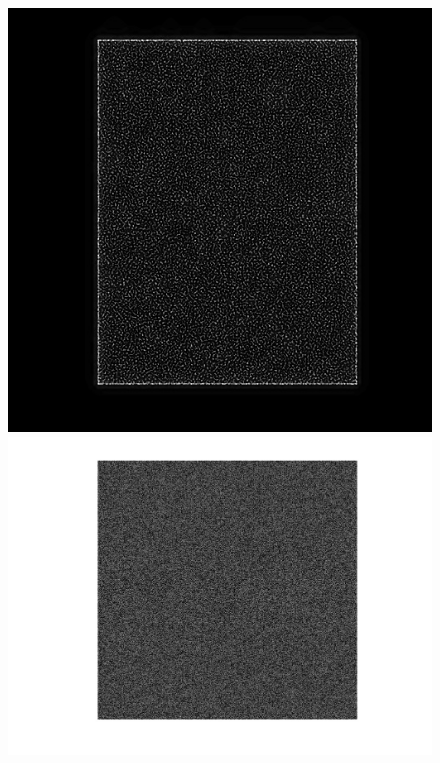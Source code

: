 \documentclass[a4paper]{article} %
\begin{document}
\begin{figure}[!htb]
\endminipage\hfill
{}%
  \includegraphics[width=\linewidth]{mult_Eq_Phantom_0p500_4_1_1.jpg}
\endminipage\hfill
  \includegraphics[width=\linewidth]{Eq_Phantom_0p700_4_1_1.jpg}
\endminipage\hfill
{}%

\end{figure}
\end{document}
